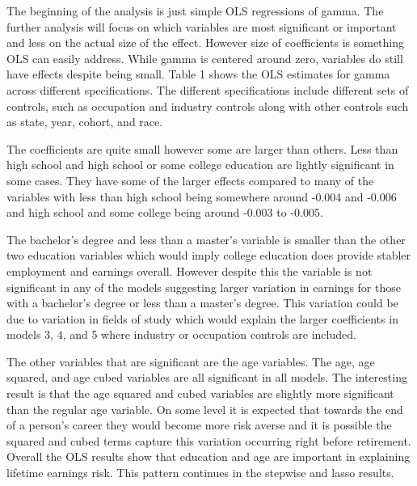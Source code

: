 \documentclass[12pt]{article}
\begin{document}
\begin{onehalfspace}



The beginning of the analysis is just simple OLS regressions of gamma. The further analysis will focus on which variables are most significant or important and less on the actual size of the effect. However size of coefficients is something OLS can easily address. While gamma is centered around zero, variables do still have effects despite being small. Table 1 shows the OLS estimates for gamma across different specifications. The different specifications include different sets of controls, such as occupation and industry controls along with other controls such as state, year, cohort, and race.


The coefficients are quite small however some are larger than others. Less than high school and high school or some college education are lightly significant in some cases. They have some of the larger effects compared to many of the variables with less than high school being somewhere around -0.004 and -0.006 and high school and some college being around -0.003 to -0.005. 

The bachelor's degree and less than a master's variable is smaller than the other two education variables which would imply college education does provide stabler employment and earnings overall. However despite this the variable is not significant in any of the models suggesting larger variation in earnings for those with a bachelor's degree or less than a master's degree. This variation could be due to variation in fields of study which would explain the larger coefficients in models 3, 4, and 5 where industry or occupation controls are included.


The other variables that are significant are the age variables. The age, age squared, and age cubed variables are all significant in all models. The interesting result is that the age squared and cubed variables are slightly more significant than the regular age variable. On some level it is expected that towards the end of a person's career they would become more risk averse and it is possible the squared and cubed terms capture this variation occurring right before retirement. Overall the OLS results show that education and age are important in explaining lifetime earnings risk. This pattern continues in the stepwise and lasso results.



\end{onehalfspace}
\end{document}
